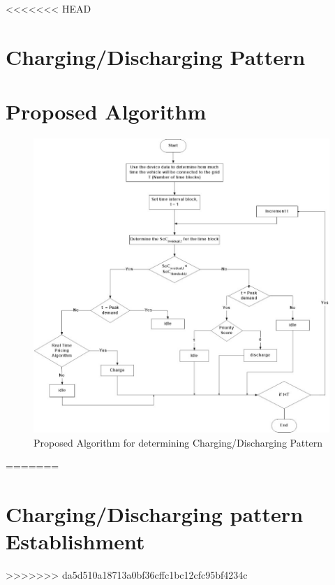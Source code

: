 <<<<<<< HEAD
	\section{Charging/Discharging Pattern}
	
	\section{Proposed Algorithm}
		\begin{figure}
			\centering
			\includegraphics[width=1\linewidth]{Ev_flowchart}
			\caption{Proposed Algorithm for determining Charging/Discharging Pattern}
			\label{fig:evflowchart}
		\end{figure}
		
	
	
=======
	\section{Charging/Discharging pattern Establishment}
>>>>>>> da5d510a18713a0bf36cffc1bc12cfc95bf4234c
